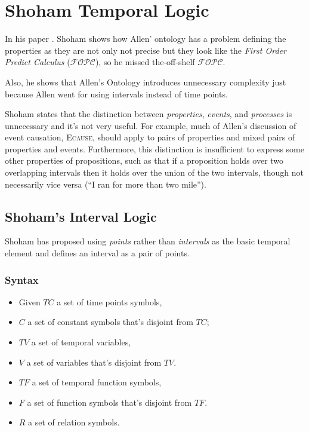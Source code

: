 \section{Shoham Temporal Logic}

In his paper \cite{shoham1988temporal}.
Shoham shows how Allen' ontology has a problem defining the properties as they are not only not precise but they look like the \textit{First Order Predict Calculus} 
($\mathcal{FOPC}$), so he missed the-off-shelf $\mathcal{FOPC}$.

Also, he shows that Allen's Ontology introduces unnecessary complexity just because Allen went for using intervals instead of time points.

Shoham states that the distinction between \textit{properties}, \textit{events}, and \textit{processes} is unnecessary and it's not very useful.
For example, much of Allen's discussion of event causation, \textsc{Ecause}, should apply to pairs of properties and mixed pairs of properties and events. Furthermore, this distinction is insufficient to express some other properties of propositions, such as that if a proposition holds over two overlapping intervals then it holds over
the union of the two intervals, though not necessarily vice versa (``I ran for more than two mile'').


\subsection{Shoham's Interval Logic}
Shoham has proposed using \textit{points} rather than \textit{intervals} as the basic temporal element and defines an interval as a pair of points.
\subsubsection{Syntax}
\begin{itemize}
	\item Given $TC$ a set of time points symbols,
	\item $C$ a set of constant symbols that's disjoint from $TC$;
	\item $TV$ a set of temporal variables,
	\item $V$ a set of variables that's disjoint from $TV$.
	\item $TF$ a set of temporal function symbols,
	\item $F$ a set of function symbols that's disjoint from $TF$.
	\item $R$ a set of relation symbols.
\end{itemize}

